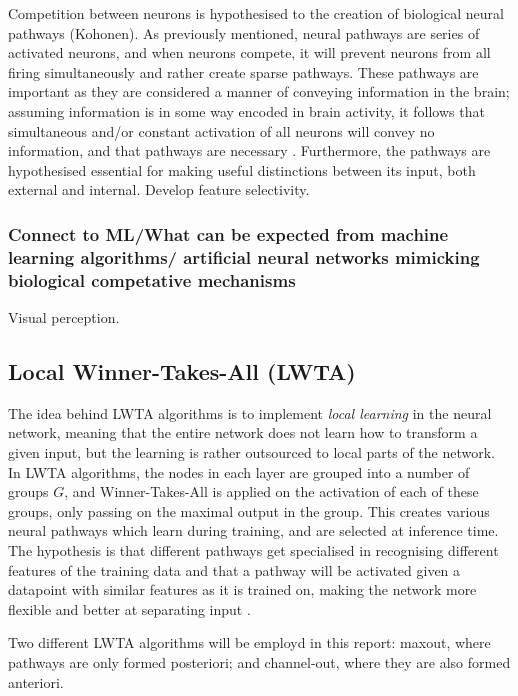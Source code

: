         Competition between neurons is hypothesised to  the creation of biological neural pathways (Kohonen).
        As previously mentioned, neural pathways are series of activated neurons, and when neurons compete, it will prevent neurons from all firing simultaneously and rather create sparse pathways. 
        These pathways are important as they are considered a manner of conveying information in the brain; assuming information is in some way encoded in brain activity, it follows that simultaneous and/or constant activation of all neurons will convey no information, and that pathways are necessary \citep{Chen}. 
        Furthermore, the pathways are hypothesised essential for making useful distinctions between its input, both external and internal. Develop feature selectivity.

    \subsubsection{Connect to ML/What can be expected from machine learning algorithms/ artificial neural networks mimicking biological competative mechanisms}
        Visual perception. 

\subsection{Local Winner-Takes-All (LWTA)}
    The idea behind LWTA algorithms is to implement \textit{local learning} in the neural network, meaning that the entire network does not learn how to transform a given input, but the learning is rather outsourced to local parts of the network. In LWTA algorithms, the nodes in each layer are grouped into a number of groups $G$, and Winner-Takes-All is applied on the activation of each of these groups, only passing on the maximal output in the group. This creates various neural pathways which learn during training, and are selected at inference time. The hypothesis is that different pathways get specialised in recognising different features of the training data and that a pathway will be activated given a datapoint with similar features as it is trained on, making the network more flexible and better at separating input \citep{Wang}. 

    Two different LWTA algorithms will be employd in this report: maxout, where pathways are only formed posteriori; and channel-out, where they are also formed anteriori.

